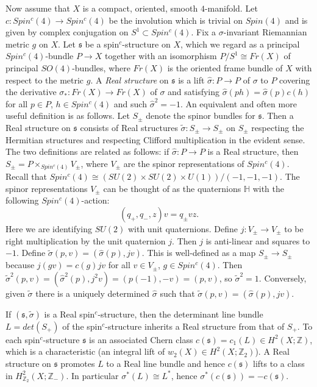 \documentclass{amsart}
\theoremstyle{definition}
\theoremstyle{remark}
\numberwithin{equation}{section}
\begin{document}
Now assume that $X$ is a compact, oriented, smooth $4$-manifold. Let $c : Spin^c(4) \to Spin^c(4)$ be the involution which is trivial on $Spin(4)$ and is given by complex conjugation on $S^1 \subset Spin^c(4)$. Fix a $\sigma$-invariant Riemannian metric $g$ on $X$. Let $\mathfrak{s}$ be a spin$^c$-structure on $X$, which we regard as a principal $Spin^c(4)$-bundle $P \to X$ together with an isomorphism $P/S^1 \cong Fr(X)$ of principal $SO(4)$-bundles, where $Fr(X)$ is the oriented frame bundle of $X$ with respect to the metric $g$. A {\em Real structure} on $\mathfrak{s}$ is a lift $\widehat{\sigma} : P \to P$ of $\sigma$ to $P$ covering the derivative $\sigma_* : Fr(X) \to Fr(X)$ of $\sigma$ and satisfying $\widehat{\sigma}(ph) = \widehat{\sigma}(p) c(h)$ for all $p \in P$, $h \in Spin^c(4)$ and such $\widehat{\sigma}^2 = -1$. An equivalent and often more useful definition is as follows. Let $S_{\pm}$ denote the spinor bundles for $\mathfrak{s}$. Then a Real structure on $\mathfrak{s}$ consists of Real structures $\widetilde{\sigma} : S_{\pm} \to S_{\pm}$ on $S_{\pm}$ respecting the Hermitian structures and respecting Clifford multiplication in the evident sense. The two definitions are related as follows: if $\widehat{\sigma} : P \to P$ is a Real structure, then $S_{\pm} = P \times_{Spin^c(4)} V_{\pm}$, where $V_{\pm}$ are the spinor representations of $Spin^c(4)$. Recall that $Spin^c(4) \cong (SU(2) \times SU(2) \times U(1))/(-1,-1,-1)$. The spinor representations $V_{\pm}$ can be thought of as the quaternions $\mathbb{H}$ with the following $Spin^c(4)$-action:
\[
( q_+ , q_- , z ) v = q_{\pm} v z.
\]
Here we are identifying $SU(2)$ with unit quaternions. Define $j : V_{\pm} \to V_{\pm}$ to be right multiplication by the unit quaternion $j$. Then $j$ is anti-linear and squares to $-1$. Define $\widetilde{\sigma}( p , v ) = (\widehat{\sigma}(p) , jv )$. This is well-defined as a map $S_{\pm} \to S_{\pm}$ because $j(gv) = c(g)jv$ for all $v \in V_{\pm}$, $g \in Spin^c(4)$. Then $\widetilde{\sigma}^2(p,v) = (\widehat{\sigma}^2(p) , j^2 v ) = ( p(-1) , -v ) = (p,v)$, so $\widetilde{\sigma}^2 = 1$. Conversely, given $\widetilde{\sigma}$ there is a uniquely determined $\widehat{\sigma}$ such that $\widetilde{\sigma}(p,v) = (\widehat{\sigma}(p) , jv)$. 

If $(\mathfrak{s} , \widetilde{\mathfrak{\sigma}})$ is a Real spin$^c$-structure, then the determinant line bundle $L = det(S_+)$ of the spin$^c$-structure inherits a Real structure from that of $S_+$. To each spin$^c$-structure $\mathfrak{s}$ is an associated Chern class $c(\mathfrak{s}) = c_1(L) \in H^2(X ; \mathbb{Z})$, which is a characteristic (an integral lift of $w_2(X) \in H^2(X ; \mathbb{Z}_2)$). A Real structure on $\mathfrak{s}$ promotes $L$ to a Real line bundle and hence $c(\mathfrak{s})$ lifts to a class in $H^2_{\mathbb{Z}_2}(X ; \mathbb{Z}_-)$. In particular $\sigma^*(L) \cong L^*$, hence $\sigma^*(c(\mathfrak{s})) = -c(\mathfrak{s})$.
\end{document}
